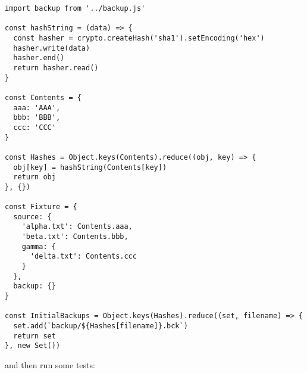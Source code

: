 \documentclass[krantzl]{krantz}
\begin{document}
\begin{lstlisting}[frame=tblr]
import backup from '../backup.js'

const hashString = (data) => {
  const hasher = crypto.createHash('sha1').setEncoding('hex')
  hasher.write(data)
  hasher.end()
  return hasher.read()
}

const Contents = {
  aaa: 'AAA',
  bbb: 'BBB',
  ccc: 'CCC'
}

const Hashes = Object.keys(Contents).reduce((obj, key) => {
  obj[key] = hashString(Contents[key])
  return obj
}, {})

const Fixture = {
  source: {
    'alpha.txt': Contents.aaa,
    'beta.txt': Contents.bbb,
    gamma: {
      'delta.txt': Contents.ccc
    }
  },
  backup: {}
}

const InitialBackups = Object.keys(Hashes).reduce((set, filename) => {
  set.add(`backup/${Hashes[filename]}.bck`)
  return set
}, new Set())
\end{lstlisting}



\noindent and then run some tests:
\end{document}

